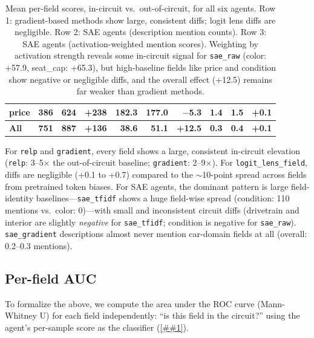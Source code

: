 \documentclass{article} %
\newcommand{\Cref}[1]{\ref{##1}}
\begin{document}
\begin{table}[h]
\begin{tabular}{@{}l rrr | rrr | rrr@{}}
price & 386 & 624 & +238 & 182.3 & 177.0 & $-$5.3 & 1.4 & 1.5 & +0.1 \\
\midrule
\textbf{All} & \textbf{751} & \textbf{887} & \textbf{+136} & \textbf{38.6} & \textbf{51.1} & \textbf{+12.5} & \textbf{0.3} & \textbf{0.4} & \textbf{+0.1} \\
\bottomrule
\end{tabular}
\caption{Mean per-field scores, in-circuit vs.\ out-of-circuit, for all six agents. Row 1: gradient-based methods show large, consistent diffs; logit lens diffs are negligible. Row 2: SAE agents (description mention counts). Row 3: SAE agents (activation-weighted mention scores). Weighting by activation strength reveals some in-circuit signal for \texttt{sae\_raw} (color: +57.9, seat\_cap: +65.3), but high-baseline fields like price and condition show negative or negligible diffs, and the overall effect (+12.5) remains far weaker than gradient methods.}
\label{tab:perfield_scores}
\end{table}

For \texttt{relp} and \texttt{gradient}, every field shows a large, consistent in-circuit elevation (\texttt{relp}: 3--5$\times$ the out-of-circuit baseline; \texttt{gradient}: 2--9$\times$).
For \texttt{logit\_lens\_field}, diffs are negligible (+0.1 to +0.7) compared to the ${\sim}$10-point spread across fields from pretrained token biases.
For SAE agents, the dominant pattern is large field-identity baselines---\texttt{sae\_tfidf} shows a huge field-wise spread (condition: 110 mentions vs.\ color: 0)---with small and inconsistent circuit diffs (drivetrain and interior are slightly \emph{negative} for \texttt{sae\_tfidf}; condition is negative for \texttt{sae\_raw}).
\texttt{sae\_gradient} descriptions almost never mention car-domain fields at all (overall: 0.2--0.3 mentions).

\subsection{Per-field AUC}

To formalize the above, we compute the area under the ROC curve (Mann-Whitney U) for each field independently: ``is this field in the circuit?'' using the agent's per-sample score as the classifier (\Cref{tab:perfield_auc}).
\end{document}
